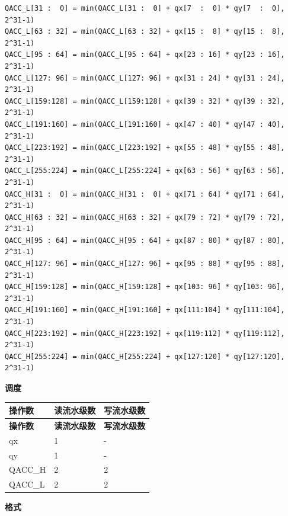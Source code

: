 \begin{lstlisting}
QACC_L[31 :  0] = min(QACC_L[31 :  0] + qx[7  :  0] * qy[7  :  0], 2^31-1)
QACC_L[63 : 32] = min(QACC_L[63 : 32] + qx[15 :  8] * qy[15 :  8], 2^31-1)
QACC_L[95 : 64] = min(QACC_L[95 : 64] + qx[23 : 16] * qy[23 : 16], 2^31-1)
QACC_L[127: 96] = min(QACC_L[127: 96] + qx[31 : 24] * qy[31 : 24], 2^31-1)
QACC_L[159:128] = min(QACC_L[159:128] + qx[39 : 32] * qy[39 : 32], 2^31-1)
QACC_L[191:160] = min(QACC_L[191:160] + qx[47 : 40] * qy[47 : 40], 2^31-1)
QACC_L[223:192] = min(QACC_L[223:192] + qx[55 : 48] * qy[55 : 48], 2^31-1)
QACC_L[255:224] = min(QACC_L[255:224] + qx[63 : 56] * qy[63 : 56], 2^31-1)
QACC_H[31 :  0] = min(QACC_H[31 :  0] + qx[71 : 64] * qy[71 : 64], 2^31-1)
QACC_H[63 : 32] = min(QACC_H[63 : 32] + qx[79 : 72] * qy[79 : 72], 2^31-1)
QACC_H[95 : 64] = min(QACC_H[95 : 64] + qx[87 : 80] * qy[87 : 80], 2^31-1)
QACC_H[127: 96] = min(QACC_H[127: 96] + qx[95 : 88] * qy[95 : 88], 2^31-1)
QACC_H[159:128] = min(QACC_H[159:128] + qx[103: 96] * qy[103: 96], 2^31-1)
QACC_H[191:160] = min(QACC_H[191:160] + qx[111:104] * qy[111:104], 2^31-1)
QACC_H[223:192] = min(QACC_H[223:192] + qx[119:112] * qy[119:112], 2^31-1)
QACC_H[255:224] = min(QACC_H[255:224] + qx[127:120] * qy[127:120], 2^31-1)

\end{lstlisting}

\textbf{调度}\\
\begin{longtable}[c]{|l|l|l|}
    \hline
    \rowcolor{lightgray}
    \textbf{操作数} & \textbf{读流水级数} & \textbf{写流水级数} \\\hline
    \endfirsthead
    \hline
    \rowcolor{lightgray}
     \textbf{操作数} & \textbf{读流水级数} & \textbf{写流水级数} \\\hline
    \endhead
    \hline
    \endfoot

     qx & 1 & - \\\hline
     qy & 1 & - \\\hline
     QACC\_H & 2 & 2 \\\hline
     QACC\_L & 2 & 2

\end{longtable}

\textbf{格式}\\

